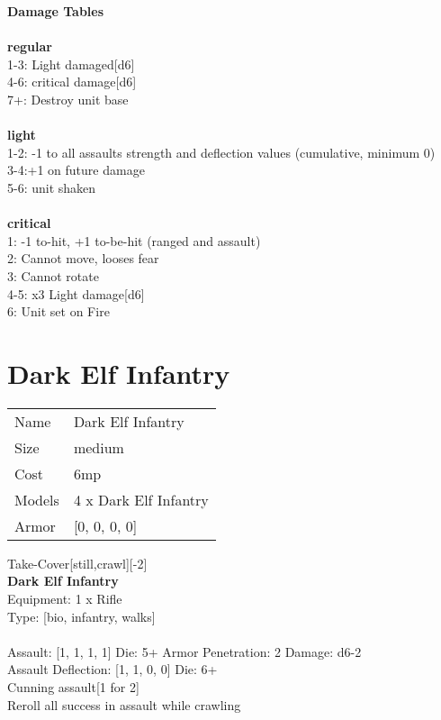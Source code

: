 {\bf Damage Tables} \\
\ \\ {\bf regular } \\
1-3: Light damaged[d6] \\
4-6: critical damage[d6] \\
7+: Destroy unit base \\
\ \\ {\bf light } \\
1-2: -1 to all assaults strength and deflection values (cumulative, minimum 0) \\
3-4:+1 on future damage \\
5-6: unit shaken \\
\ \\ {\bf critical } \\
1: -1 to-hit, +1 to-be-hit (ranged and assault) \\
2: Cannot move, looses fear \\
3: Cannot rotate \\
4-5: x3 Light damage[d6] \\
6: Unit set on Fire \\










\pagebreak\pagebreak

\section{ Dark Elf Infantry }

\begin{tabular}{ll}
  Name & Dark Elf Infantry \\
  Size & medium\\
  Cost & 6mp\\
  Models & 4 x Dark Elf Infantry\\
  Armor & [0, 0, 0, 0]\\
\end{tabular}

\noindent Take-Cover[still,crawl][-2]\\ 


{\bf Dark Elf Infantry } \\
Equipment: 1 x Rifle \\
Type: [bio, infantry, walks] \\
\ \\
Assault: [1, 1, 1, 1] Die: 5+ Armor Penetration: 2 Damage: d6-2 \\
Assault Deflection: [1, 1, 0, 0] Die: 6+\\
\indent Cunning assault[1 for 2]\\ 
Reroll all success in assault while crawling\\ 
 
